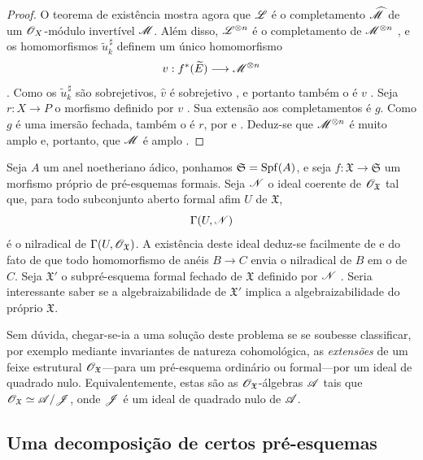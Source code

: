 \begin{proof}
O teorema de existência  mostra agora que $\mathscr{L}$ é
o completamento $\widehat{\mathscr{M}}$ de um
$\mathscr{O}_X$-módulo invertível $\mathscr{M}$. Além disso,
$\mathscr{L}^{\otimes n}$ é o completamento de
$\mathscr{M}^{\otimes n}$ , e os homomorfismos
$\widetilde{u}_k^{\,\sharp}$ definem um único homomorfismo
\[
  v:f^*(\widetilde{E})
  \longrightarrow
  \mathscr{M}^{\otimes n}
\]
. Como os
$\widetilde{u}_k^{\,\sharp}$ são sobrejetivos,
$\widehat{v}$ é sobrejetivo , e portanto também
o é $v$ . Seja $r:X\to P$ o morfismo definido
por $v$ . Sua extensão aos completamentos é
$g$. Como $g$ é uma imersão fechada, também o é $r$, por
 e . Deduz-se que
$\mathscr{M}^{\otimes n}$ é muito amplo  e, portanto,
que $\mathscr{M}$ é amplo .
\end{proof}

\begin{remark}[5.4.6]
\label{III.5.4.6}
Seja $A$ um anel noetheriano ádico, ponhamos
$\mathfrak{S}=\operatorname{Spf}(A)$, e seja
$f:\mathfrak{X}\to\mathfrak{S}$ um morfismo próprio de pré-esquemas
formais. Seja $\mathscr{N}$ o ideal coerente de
$\mathscr{O}_{\mathfrak{X}}$ tal que, para todo subconjunto aberto
formal afim $U$ de $\mathfrak{X}$,
\[
  \Gamma(U,\mathscr{N})
\]
é o nilradical de
$\Gamma(U,\mathscr{O}_{\mathfrak{X}})$. A existência deste ideal
deduz-se facilmente de  e do fato de que
todo homomorfismo de anéis $B\to C$ envia o nilradical de $B$ em
o de $C$. Seja $\mathfrak{X}'$ o subpré-esquema formal fechado de
$\mathfrak{X}$ definido por $\mathscr{N}$
. Seria interessante saber se a
algebraizabilidade de $\mathfrak{X}'$ implica a algebraizabilidade do
próprio $\mathfrak{X}$.

Sem dúvida, chegar-se-ia a uma solução deste problema se se soubesse
classificar, por exemplo mediante invariantes
de natureza cohomológica, as \emph{extensões} de um feixe estrutural
$\mathscr{O}_{\mathfrak{X}}$---para um pré-esquema ordinário ou
formal---por um ideal de quadrado nulo. Equivalentemente, estas são as
$\mathscr{O}_{\mathfrak{X}}$-álgebras $\mathscr{A}$ tais que
$\mathscr{O}_{\mathfrak{X}}\simeq\mathscr{A}/\mathscr{J}$, onde $\mathscr{J}$ é um
ideal de quadrado nulo de $\mathscr{A}$.
\end{remark}


\subsection{Uma decomposição de certos pré-esquemas}
\label{subsection:III.5.5}

